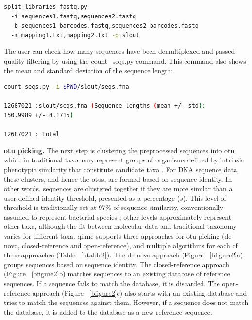 \begin{lstlisting}[language=bash]
split_libraries_fastq.py
  -i sequences1.fastq,sequences2.fastq
  -b sequences1_barcodes.fastq,sequences2_barcodes.fastq
  -m mapping1.txt,mapping2.txt -o slout
\end{lstlisting}

The user can check how many sequences have been demultiplexed and passed quality-filtering
by using the count\_seqs.py command. This command also shows the mean and standard
deviation of the sequence length:

\begin{lstlisting}[language=bash]
count_seqs.py -i $PWD/slout/seqs.fna

12687021 :slout/seqs.fna (Sequence lengths (mean +/- std):
150.9989 +/- 0.1715)

12687021 : Total
\end{lstlisting}

\textbf{\gls{otu} picking.} The next step is clustering the preprocessed sequences
into \gls{otu}, which in traditional taxonomy represent groups of organisms defined by
intrinsic phenotypic similarity that constitute candidate taxa \cite{Sneath1973, Sokal1963}.
For DNA sequence data, these clusters, and hence the \gls{otu}s, are formed based on sequence
identity. In other words, sequences are clustered together if they are more similar than a
user-defined identity threshold, presented as a percentage ($s$). This level of threshold
is traditionally set at 97\% of sequence similarity, conventionally assumed to represent
bacterial species \cite{Drancourt2000}; other levels approximately represent other taxa,
although the fit between molecular data and traditional taxonomy varies for different taxa.
\gls{qiime} supports three approaches for \gls{otu} picking (de novo, closed-reference and open-reference),
and multiple algorithms for each of these approaches (Table ~\ref{btable2}). The de novo
approach (Figure ~\ref{bfigure2}a) groups sequences based on sequence identity. The closed-reference approach
(Figure ~\ref{bfigure2}b) matches sequences to an existing database of reference sequences. If a sequence fails
to match the database, it is discarded. The open-reference approach (Figure ~\ref{bfigure2}c) also
starts with an existing database and tries to match the sequences against them. However, if a
sequence does not match the database, it is added to the database as a new reference sequence.

